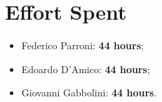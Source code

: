 \chapter{Effort Spent}
\begin{itemize}
\item Federico Parroni: \textbf{44 hours};
\item Edoardo D'Amico: \textbf{44 hours};
\item Giovanni Gabbolini: \textbf{44 hours}.
\end{itemize}

